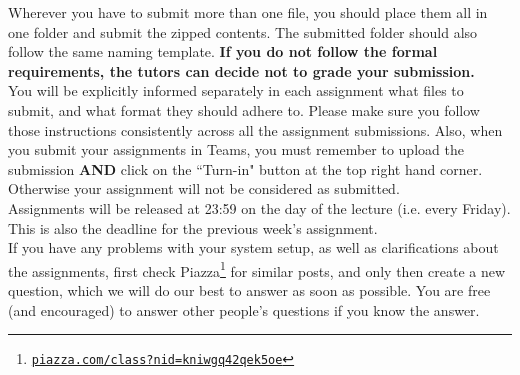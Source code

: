 \documentclass[a4paper,10pt]{article}
\begin{document}
Wherever you have to submit more than one file, you should place them all in one folder and submit the zipped contents. The submitted folder should also follow the same naming template. 
\textbf{If you do not follow the formal requirements, the tutors can decide not to grade your submission.} \\

You will be explicitly informed separately in each assignment what files to submit, and what format they should adhere to. Please make sure you follow those instructions consistently across all the assignment submissions. Also, when you submit your assignments in Teams, you must remember to upload the submission \textbf{AND} click on the ``Turn-in" button at the top right hand corner. Otherwise your assignment will not be considered as submitted. \\

Assignments will be released at 23:59 on the day of the lecture (i.e. every Friday). This is also the deadline for the previous week's assignment.\\

If you have any problems with your system setup, as well as clarifications about the assignments, first check Piazza\footnote{\href{https://piazza.com/class?nid=kniwgq42qek5oe}{\nolinkurl{piazza.com/class?nid=kniwgq42qek5oe}}} for similar posts, and only then create a new question, which we will do our best to answer as soon as possible. You are free (and encouraged) to answer other people's questions if you know the answer.
\end{document}
